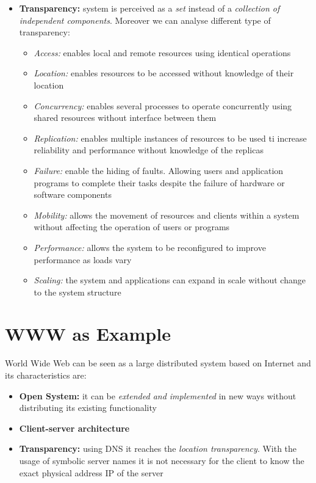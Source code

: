 \begin{itemize}
    \item \textbf{Transparency:} system is perceived as a \textit{set} instead of a \textit{collection of independent components}. Moreover we can analyse different type of transparency:
        \begin{itemize}
            \item \textit{Access:} enables local and remote resources using identical operations
            \item \textit{Location:} enables resources to be accessed without knowledge of their location
            \item \textit{Concurrency:} enables several processes to operate concurrently using shared resources without interface between them
            \item \textit{Replication:} enables multiple instances of resources to be used ti increase reliability and performance without knowledge of the replicas
            \item \textit{Failure:} enable the hiding of faults. Allowing users and application programs to complete their tasks despite the failure of hardware or software components
            \item \textit{Mobility:} allows the movement of resources and clients within a system without affecting the operation of users or programs
            \item \textit{Performance:} allows the system to be reconfigured to improve performance as loads vary
            \item \textit{Scaling:} the system and applications can expand in scale without change to the system structure
        \end{itemize}
\end{itemize}

\section{WWW as Example}
World Wide Web can be seen as a large distributed system based on Internet and its characteristics are:
\begin{itemize}
    \item \textbf{Open System:} it can be \textit{extended and implemented} in new ways without distributing its existing functionality 
    \item \textbf{Client-server architecture}
    \item \textbf{Transparency:}  using DNS it reaches the \textit{location transparency}. With the usage of symbolic server names it is not necessary for the client to know the exact physical address IP of the server
\end{itemize}
